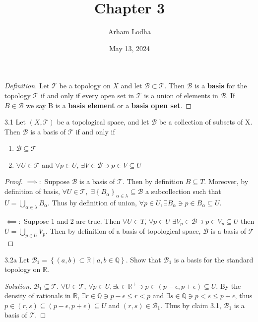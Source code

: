 \documentclass{article}
\newcommand*{\T}{\mathcal{T}}
\newcommand*{\B}{\mathcal{B}}
\newcommand{\R}{\mathbb{R}}
\newcommand{\Q}{\mathbb{Q}}
\newenvironment{solution}
{\renewcommand\qedsymbol{$\blacksquare$}\begin{proof}[Solution]}
{\end{proof}}
\newenvironment{definition}
{\renewcommand\qedsymbol{$\blacksquare$}\begin{proof}[Definition]}
{\end{proof}}
\begin{document}
\title{Chapter 3}
\author{Arham Lodha}%
\date{May 13, 2024}%
\maketitle

\begin{definition}
    Let $\T$ be a topology on $X$ and let $\B \subset \T$. Then $\B$ is a \textbf{basis} for the topology $\T$ if and only if every open set in $\T$ is a union of elements in $\B$. If $B \in \B$ we say B is a \textbf{basis element} or a \textbf{basis open set}.        
\end{definition}

\begin{claim}{3.1}\label{Claim 3.1.}
    Let $(X, \T)$ be a topological space, and let $\B$ be a collection of subsets of X. Then $\B$ is a basis of $\T$ if and only if
    
    \begin{enumerate}
        \item $\B \subseteq \T$
        \item $\forall U \in \T$ and $\forall p \in U$, $\exists V \in \B \ni p \in V \subseteq U$   
    \end{enumerate}
    
\end{claim}
\begin{proof}
    $\implies:$ Suppose $\B$ is a basis of $\T$. Then by definition $B \subseteq T$. Moreover, by definition of basis, $\forall U \in \T,$ $\exists \left\{ B_\alpha \right\}_{\alpha \in \lambda} \subseteq \B$ a subcollection such that $U = \bigcup_{\alpha \in \lambda} B_\alpha$. Thus by definition of union, $\forall p \in U, \exists B_\alpha \ni p \in B_\alpha \subseteq U$. 
    
    $\impliedby:$ Suppose 1 and 2 are true. Then $\forall U \in T$, $\forall p \in U$ $\exists V_p \in \B \ni p \in V_p \subseteq U$ then $U = \bigcup_{p \in U} V_p$. Then by definition of a basis of topological space, $\B$ is a basis of $\T$          
\end{proof}

\bigskip

\begin{PROB}{3.2a}\label{Problem 3.2a.}
    Let $\B_1 = \left\{ (a, b) \subset \R \mid a, b \in \Q \right\}$. Show that $\B_1$ is a basis for the standard topology on $\R$.    
\end{PROB}
\begin{solution}
    $\B_1 \subseteq \T$. $\forall U \in \T$, $\forall p \in U, \exists \epsilon \in \R^+ \ni p \in (p - \epsilon, p + \epsilon) \subseteq U$. By the density of rationals in $\R$, $\exists r \in \Q \ni p - \epsilon \leq r < p$ and $\exists s \in \Q \ni p < s \leq p + \epsilon$, thus $p \in (r, s) \subseteq (p - \epsilon, p + \epsilon) \subseteq U$ and $(r, s) \in \B_1$. Thus by claim 3.1, $\B_1$ is a basis of $\T$.          
\end{solution}
\end{document}

